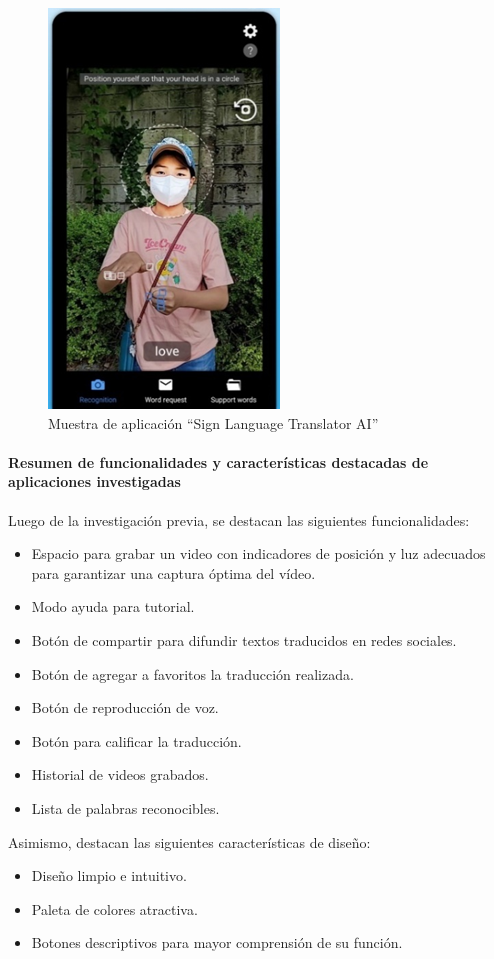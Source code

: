\begin{figure} [H]
    \centering
    \includegraphics[width=0.25\linewidth]{figuras/ai_sign_lenguaje.png}
    \caption{Muestra de aplicación “Sign Language Translator AI”}
    \label{fig:enter-label}
\end{figure}

\paragraph{Resumen de funcionalidades y características destacadas de aplicaciones investigadas}

Luego de la investigación previa, se destacan las siguientes funcionalidades:
\begin{itemize}
    \item Espacio para grabar un video con indicadores de posición y luz adecuados para garantizar una captura óptima del vídeo.
    \item Modo ayuda para tutorial.
    \item Botón de compartir para difundir textos traducidos en redes sociales.
    \item Botón de agregar a favoritos la traducción realizada.
    \item Botón de reproducción de voz.
    \item Botón para calificar la traducción.
    \item Historial de videos grabados.
    \item Lista de palabras reconocibles.
\end{itemize}

Asimismo, destacan las siguientes características de diseño:
\begin{itemize}
    \item Diseño limpio e intuitivo.
    \item Paleta de colores atractiva.
    \item Botones descriptivos para mayor comprensión de su función.
\end{itemize}

